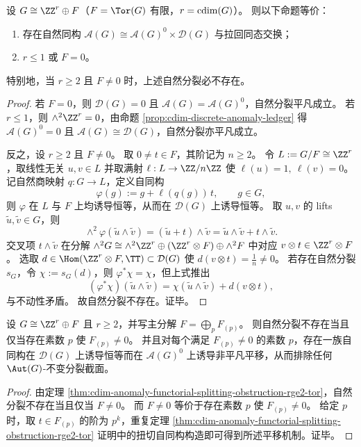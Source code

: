 \begin{theorem}[分裂失败的结构条件]\label{thm:cdim-anomaly-functorial-splitting-obstruction-rge2-tor}
设 \(G\cong \ZZ^r\oplus F\)（\(F=\Tor(G)\) 有限，\(r=\operatorname{cdim}(G)\)）。
则以下命题等价：
\begin{enumerate}
  \item 存在自然同构 \(\mathcal A(G)\cong \mathcal A(G)^0\times \mathcal D(G)\) 与拉回同态交换；
  \item \(r\le 1\) 或 \(F=0\)。
\end{enumerate}
特别地，当 \(r\ge 2\) 且 \(F\neq 0\) 时，上述自然分裂必不存在。
\end{theorem}
\begin{proof}
若 \(F=0\)，则 \(\mathcal D(G)=0\) 且 \(\mathcal A(G)=\mathcal A(G)^0\)，自然分裂平凡成立。
若 \(r\le 1\)，则 \(\wedge^2\ZZ^r=0\)，由命题 \ref{prop:cdim-discrete-anomaly-ledger} 得 \(\mathcal A(G)^0=0\) 且 \(\mathcal A(G)\cong\mathcal D(G)\)，自然分裂亦平凡成立。

反之，设 \(r\ge 2\) 且 \(F\neq 0\)。
取 \(0\neq t\in F\)，其阶记为 \(n\ge 2\)。
令 \(L:=G/F\cong \ZZ^r\)，取线性无关 \(u,v\in L\) 并取满射 \(\ell:L\to \ZZ/n\ZZ\) 使 \(\ell(u)=1,\ \ell(v)=0\)。
记自然商映射 \(q:G\to L\)，定义自同构
\[
\varphi(g):=g+\ell(q(g))\,t,\qquad g\in G,
\]
则 \(\varphi\) 在 \(L\) 与 \(F\) 上均诱导恒等，从而在 \(\mathcal D(G)\) 上诱导恒等。
取 \(u,v\) 的 lifts \(\tilde u,\tilde v\in G\)，则
\[
\wedge^2\varphi(\tilde u\wedge \tilde v)
=(\tilde u+t)\wedge \tilde v
=\tilde u\wedge \tilde v+t\wedge \tilde v.
\]
交叉项 \(t\wedge \tilde v\) 在分解 \(\wedge^2G\cong \wedge^2\ZZ^r\oplus(\ZZ^r\otimes F)\oplus\wedge^2F\) 中对应 \(v\otimes t\in \ZZ^r\otimes F\)。
选取 \(d\in \Hom(\ZZ^r\otimes F,\TT)\subset \mathcal D(G)\) 使 \(d(v\otimes t)=\tfrac1n\neq 0\)。
若存在自然分裂 \(s_G\)，令 \(\chi:=s_G(d)\)，则 \(\varphi^\ast\chi=\chi\)，但上式推出
\[
(\varphi^\ast\chi)(\tilde u\wedge \tilde v)
=\chi(\tilde u\wedge \tilde v)+d(v\otimes t),
\]
与不动性矛盾。
故自然分裂不存在。证毕。
\end{proof}

\begin{corollary}[障碍的素数支撑刻画]\label{cor:cdim-anomaly-splitting-prime-support}
设 \(G\cong \ZZ^r\oplus F\) 且 \(r\ge 2\)，并写主分解 \(F=\bigoplus_{p}F_{(p)}\)。
则自然分裂不存在当且仅当存在素数 \(p\) 使 \(F_{(p)}\neq 0\)。
并且对每个满足 \(F_{(p)}\neq 0\) 的素数 \(p\)，存在一族自同构在 \(\mathcal D(G)\) 上诱导恒等而在 \(\mathcal A(G)^0\) 上诱导非平凡平移，从而排除任何 \(\Aut(G)\)-不变分裂截面。
\end{corollary}
\begin{proof}
由定理 \ref{thm:cdim-anomaly-functorial-splitting-obstruction-rge2-tor}，自然分裂不存在当且仅当 \(F\neq 0\)。
而 \(F\neq 0\) 等价于存在素数 \(p\) 使 \(F_{(p)}\neq 0\)。
给定 \(p\) 时，取 \(t\in F_{(p)}\) 的阶为 \(p^k\)，重复定理 \ref{thm:cdim-anomaly-functorial-splitting-obstruction-rge2-tor} 证明中的扭切自同构构造即可得到所述平移机制。证毕。
\end{proof}

